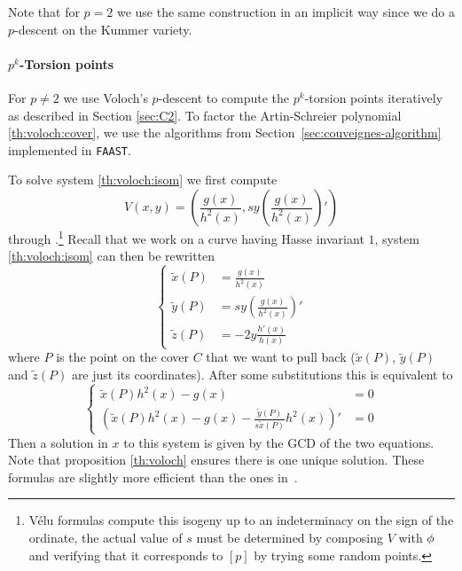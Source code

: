   Note that for $p=2$
we use the same construction in an implicit way since we do a
$p$-descent on the Kummer variety.


\paragraph{$p^k$-Torsion points}
For $p\ne2$ we use Voloch's $p$-descent to compute the $p^k$-torsion
points iteratively as described in Section \ref{sec:C2}. To factor the
Artin-Schreier polynomial \eqref{th:voloch:cover}, we use the
algorithms from Section~\ref{sec:couveignes-algorithm} implemented in
\texttt{FAAST}.

To solve system \eqref{th:voloch:isom} we first compute
\begin{equation*}
  V(x,y) = \left(\frac{g(x)}{h^2(x)}, 
    sy\left(\frac{g(x)}{h^2(x)}\right)'\right)
\end{equation*}
through .\footnote{Vélu formulas compute
  this isogeny up to an indeterminacy on the sign of the ordinate, the
  actual value of $s$ must be determined by composing $V$ with
  $\phi$ and verifying that it corresponds to $[p]$ by trying
  some random points.} Recall that we work on a curve having Hasse
invariant $1$, system \eqref{th:voloch:isom} can then be rewritten
\begin{equation*}
  \left\{
    \begin{aligned}
      \tilde{x}(P) &= \frac{g(x)}{h^2(x)}\\
      \tilde{y}(P) &= sy\left(\frac{g(x)}{h^2(x)}\right)'\\
      \tilde{z}(P) &= -2y\frac{h'(x)}{h(x)}
    \end{aligned}
  \right.
\end{equation*}
where $P$ is the point on the cover $C$ that we want to pull back
($\tilde{x}(P)$, $\tilde{y}(P)$ and $\tilde{z}(P)$ are just its
coordinates). After some substitutions this is equivalent to
\begin{equation*}
  \left\{
    \begin{aligned}
      \tilde{x}(P)h^2(x) - g(x) &= 0\\
      \left(\tilde{x}(P)h^2(x) - g(x) - \frac{\tilde{y}(P)}{s\tilde{x}(P)}h^2(x)\right)' &= 0
    \end{aligned}
  \right.
\end{equation*}
Then a solution in $x$ to this system is given by the GCD of the two
equations. Note that proposition \ref{th:voloch} ensures there is one
unique solution. These formulas are slightly more efficient than the
ones in~\cite[$\S$6.2]{lercier-algorithmique}.

